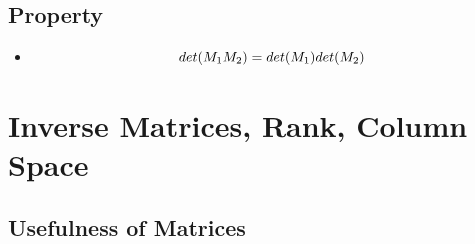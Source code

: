 \documentclass[a4paper]{article}
\begin{document}
\subsection{Property}
\begin{itemize}
	\item \[
		      det(M_1 M_2) = det(M_1) det(M_2) \\
	      \]
\end{itemize}

\newpage
\section{Inverse Matrices, Rank, Column Space}

\subsection{Usefulness of Matrices}
\end{document}
